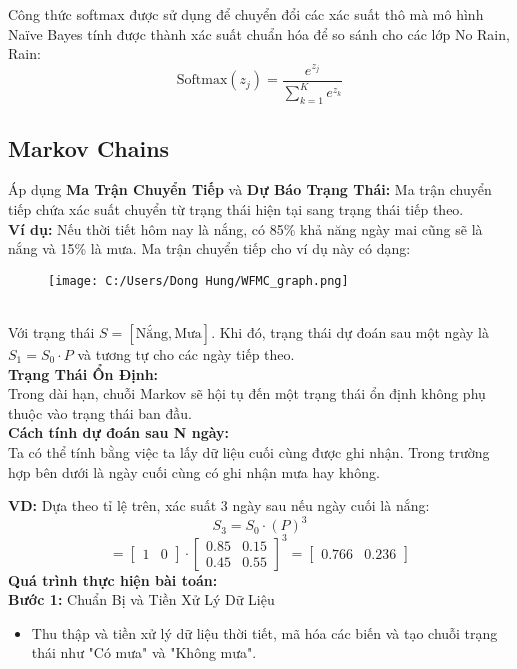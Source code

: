 \documentclass[conference]{IEEEtran}
\begin{document}
Công thức softmax được sử dụng để chuyển đổi các xác suất thô mà mô hình Naïve Bayes tính được thành xác suất chuẩn hóa để so sánh cho các lớp No Rain, Rain:
\[
\text{Softmax}(z_j) = \frac{e^{z_j}}{\sum_{k=1}^{K} e^{z_k}}
\]
\subsection{Markov Chains}
\noindent Áp dụng \textbf{Ma Trận Chuyển Tiếp} và \textbf{Dự Báo Trạng Thái:}
Ma trận chuyển tiếp chứa xác suất chuyển từ trạng thái hiện tại sang trạng thái tiếp theo. \\
\textbf{Ví dụ:} Nếu thời tiết hôm nay là nắng, có 85\% khả năng ngày mai cũng sẽ là nắng và 15\% là mưa. Ma trận chuyển tiếp cho ví dụ này có dạng:
\begin{figure}[ht]
    \centering
    \texttt{[image: C:/Users/Dong Hung/WFMC\_graph.png]}
    \label{fig:my_label}
\end{figure}\\
Với trạng thái \( S = [\text{Nắng}, \text{Mưa}] \). Khi đó, trạng thái dự đoán sau một ngày là \( S_1 = S_0 \cdot P \) và tương tự cho các ngày tiếp theo.
\\
\noindent\textbf{Trạng Thái Ổn Định:}\\
\indent Trong dài hạn, chuỗi Markov sẽ hội tụ đến một trạng thái ổn định không phụ thuộc vào trạng thái ban đầu. \\
\noindent\textbf{Cách tính dự đoán sau N ngày:}\\
\indent Ta có thể tính bằng việc ta lấy dữ liệu cuối cùng được ghi nhận.
Trong trường hợp bên dưới là ngày cuối cùng có ghi nhận mưa hay không.

\noindent\textbf{VD:} Dựa theo tỉ lệ trên, xác suất 3 ngày sau nếu ngày cuối là nắng:
\[
S_3 = S_0 \cdot (P)^3
\]
\[
= \begin{bmatrix} 1 & 0 \end{bmatrix} \cdot 
\begin{bmatrix} 0.85 & 0.15 \\ 0.45 & 0.55 \end{bmatrix}^3 = \begin{bmatrix} 0.766 & 0.236 \end{bmatrix}
\]
\textbf{Quá trình thực hiện bài toán:}\\
\indent \textbf{Bước 1:} Chuẩn Bị và Tiền Xử Lý Dữ Liệu
\begin{itemize}
    \item Thu thập và tiền xử lý dữ liệu thời tiết, mã hóa các biến và tạo chuỗi trạng thái như "Có mưa" và "Không mưa".
\end{itemize}
\end{document}
